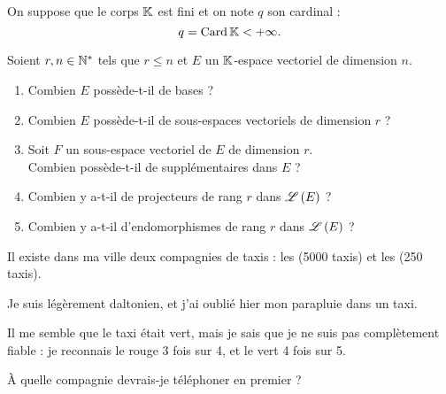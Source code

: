 \begin{exo}
On suppose que le corps \(\mathbb{K}\) est fini et on note \(q\) son cardinal : \[q=\operatorname{Card}\mathbb{K}<+\infty.\]

Soient \(r,n\in\mathbb{N}^*\) tels que \(r\leq n\) et \(E\) un \(\mathbb{K}\)-espace vectoriel de dimension \(n\).

\begin{enumerate}
    \item Combien \(E\) possède-t-il de bases ? \\
    \item Combien \(E\) possède-t-il de sous-espaces vectoriels de dimension \(r\) ? \\
    \item Soit \(F\) un sous-espace vectoriel de \(E\) de dimension \(r\). \\ Combien possède-t-il de supplémentaires dans \(E\) ? \\
    \item Combien y a-t-il de projecteurs de rang \(r\) dans \(\mathscr{L}\left(E\right)\) ? \\
    \item Combien y a-t-il d'endomorphismes de rang \(r\) dans \(\mathscr{L}\left(E\right)\) ?
\end{enumerate}
\end{exo}

\begin{corr}
\end{corr}

\begin{exo}[Exercice 4]
Il existe dans ma ville deux compagnies de taxis : les  (5000 taxis) et les  (250 taxis).

Je suis légèrement daltonien, et j'ai oublié hier mon parapluie dans un taxi.

Il me semble que le taxi était vert, mais je sais que je ne suis pas complètement fiable : je reconnais le rouge 3 fois sur 4, et le vert 4 fois sur 5.

À quelle compagnie devrais-je téléphoner en premier ?
\end{exo}

